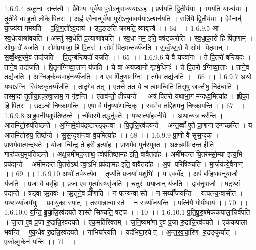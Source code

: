 1.6.9.4
ऋ॒तू॒ना सन्त॑त्यै । प्रैवैभ्य॒ पूर्व॑या पुरोऽनुवा॒क्य॑याऽऽह । प्रण॑यति द्वि॒तीय॑या । ग॒मय॑ति या॒ज्य॑या । तृ॒तीये॒ वा इ॒तो लो॒के पि॒तरः॑ । अह्न॑ ए॒वैना॒न्पूर्व॑या पुरोऽनुवा॒क्य॑या॒ऽत्यान॑यति । रात्रि॑यै द्वि॒तीय॑या । ऐवैनान्॑ या॒ज्य॑या गमयति । द॒क्षि॒ण॒तो॑ऽव॒दाय॑ । उद॒ङ्ङति॑ क्रामति॒ व्यावृ॑त्त्यै ।। 64 ।।
1.6.9.5
आ स्व॒धेत्याश्रा॑वयति । अस्तु॑ स्व॒धेति॑ प्र॒त्याश्रा॑वयति । स्व॒धा नम॒ इति॒ वष॑ट्करोति । स्व॒धा॒का॒रो हि पि॑तृ॒णाम् । सोम॒मग्रे॑ यजति । सोम॑प्रयाजा॒ हि पि॒तरः॑ । सोमं॑ पितृ॒मन्त॑य्यँजति । स॒व्वँ॒थ्स॒रो वै सोम॑ पितृ॒मान् । स॒व्वँ॒थ्स॒रमे॒व तद्य॑जति । पि॒तॄन्ब॑ऱ्हि॒षदो॑ यजति ।। 65 ।।
1.6.9.6
ये वै यज्वा॑नः । ते पि॒तरो॑ बऱ्हि॒षदः॑ । ताने॒व तद्य॑जति । पि॒तॄन॑ग्निष्वा॒त्तान् य॑जति । ये वा अय॑ज्वानो गृहमे॒धिनः॑ । ते पि॒तरोऽग्निष्वा॒त्ताः । ताने॒व तद्य॑जति । अ॒ग्निङ्क॑व्य॒वाह॑नय्यँजति । य ए॒व पि॑तृ॒णाम॒ग्निः । तमे॒व तद्य॑जति ।। 66 ।।
1.6.9.7
अथो॒ यथा॒ऽग्नि स्वि॑ष्ट॒कृत॒य्यँज॑ति । ता॒दृगे॒व तत् । ए॒तत्ते॑ तत॒ ये च॒ त्वामन्विति॑ ति॒सृषु॑ स्र॒क्तीषु॒ निद॑धाति । तस्मा॒दा तृ॒तीया॒त्पुरु॑षा॒न्नाम॒ न गृ॑ह्णन्ति । ए॒ताव॑न्तो॒ हीज्यन्ते । अत्र॑ पितरो यथाभा॒गं म॑न्दध्व॒मित्या॑ह । ह्लीका॒ हि पि॒तरः॑ । उद॑ञ्चो॒ निष्क्रा॑मन्ति । ए॒षा वै म॑नु॒ष्या॑णा॒न्दिक् । स्वामे॒व तद्दिश॒मनु॒ निष्क्रा॑मन्ति ।। 67 ।।
1.6.9.8
आ॒ह॒व॒नीय॒मुप॑तिष्ठन्ते । न्ये॑वास्मै॒ तद्ध्नु॑वते । यथ्स॒त्या॑हव॒नीये । अथा॒न्यत्र॒ चर॑न्ति । आतमि॑तो॒रुप॑तिष्ठन्ते । अ॒ग्निमे॒वोप॑द्र॒ष्टार॑ङ्कृ॒त्वा । पि॒तॄन्नि॒रव॑दयन्ते । अन्त॒व्वाँ ए॒ते प्रा॒णानाङ्गच्छन्ति । य आतमि॑तोरुप॒ तिष्ठ॑न्ते । सु॒स॒न्दृश॑न्त्वा व॒यमित्या॑ह ।। 68 ।।
1.6.9.9
प्रा॒णो वै सु॑स॒न्दृक् । प्रा॒णमे॒वात्मन्द॑धते । योजा॒ न्वि॑न्द्र ते॒ हरी॒ इत्या॑ह । प्रा॒णमे॒व पुन॑रयुक्त । अक्ष॒न्नमी॑मदन्त॒ हीति॒ गाऱ्ह॑पत्य॒मुप॑तिष्ठन्ते । अक्ष॒न्नमी॑मद॒न्ताथ॒ त्वोप॑तिष्ठामह॒ इति॒ वावैतदा॑ह । अमी॑मदन्त पि॒तर॑स्सो॒म्या इत्य॒भि प्रप॑द्यन्ते । अमी॑मदन्त पि॒तरोऽथ॑ त्वा॒ऽभि प्रप॑द्यामह॒ इति॒ वावैतदा॑ह । अ॒प परि॑षिञ्चति । मा॒र्जय॑त्ये॒वैनान्॑ ।। 69 ।।
1.6.9.10
अथो॑ त॒र्पय॑त्ये॒व । तृप्य॑ति प्र॒जया॑ प॒शुभिः॑ । य ए॒वव्वेँद॑ । अप॑ बऱ्हिषावनूया॒जौ य॑जति । प्र॒जा वै ब॒र्॒हिः । प्र॒जा ए॒व मृ॒त्योरुथ्सृ॑जति । च॒तुर॑ प्रया॒जान् य॑जति । द्वाव॑नूया॒जौ । षट्थ्सं प॑द्यन्ते । षड्वा ऋ॒तवः॑ । ऋ॒तूने॒व प्री॑णाति । न पत्न्यन्वास्ते । न सय्याँ॑जयन्ति । यत्पत्न्य॒न्वासी॑त । यथ्स॑य्याँ॒जये॑युः । प्र॒मायु॑का स्यात् । तस्मा॒न्नान्वास्ते । न सय्याँ॑जयन्ति । पत्नि॑यै गोपी॒थाय॑ ।। 70 ।।
1.6.10.0
य॒न्ति॒ ब्रू॒या॒न्नि॒रव॑दयते शास्ते सिञ्चति॒ षट्च॑ ।। 10 ।।
1.6.10.1
प्र॒ति॒पू॒रु॒षमेक॑कपाला॒न्निर्व॑पति । जा॒ता ए॒व प्र॒जा रु॒द्रान्नि॒रव॑दयते । एक॒मति॑रिक्तम् । ज॒नि॒ष्यमा॑णा ए॒व प्र॒जा रु॒द्रान्नि॒रव॑दयते । एक॑कपाला भवन्ति । ए॒क॒धैव रु॒द्रन्नि॒रव॑दयते । नाभिघा॑रयति । यद॑भिघा॒रयेत् । अ॒न्त॒र॒व॒चा॒रिण॑ रु॒द्रङ्कु॑र्यात् । ए॒को॒ल्मु॒केन॑ यन्ति ।। 71 ।।
